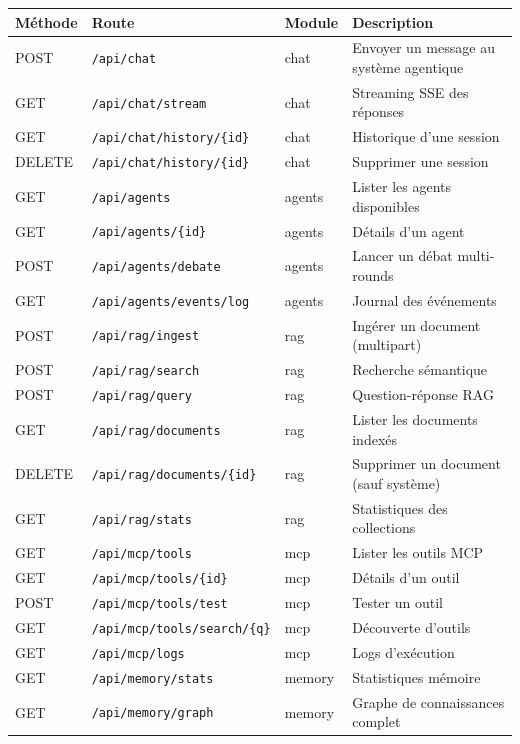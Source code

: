 \documentclass[12pt, a4paper]{article}
\begin{document}
\begin{table}[H]
\centering
\small
\begin{tabularx}{\textwidth}{l l l X}
\toprule
\textbf{Méthode} & \textbf{Route} & \textbf{Module} & \textbf{Description} \\
\midrule
POST & \texttt{/api/chat} & chat & Envoyer un message au système agentique \\
GET & \texttt{/api/chat/stream} & chat & Streaming SSE des réponses \\
GET & \texttt{/api/chat/history/\{id\}} & chat & Historique d'une session \\
DELETE & \texttt{/api/chat/history/\{id\}} & chat & Supprimer une session \\
\midrule
GET & \texttt{/api/agents} & agents & Lister les agents disponibles \\
GET & \texttt{/api/agents/\{id\}} & agents & Détails d'un agent \\
POST & \texttt{/api/agents/debate} & agents & Lancer un débat multi-rounds \\
GET & \texttt{/api/agents/events/log} & agents & Journal des événements \\
\midrule
POST & \texttt{/api/rag/ingest} & rag & Ingérer un document (multipart) \\
POST & \texttt{/api/rag/search} & rag & Recherche sémantique \\
POST & \texttt{/api/rag/query} & rag & Question-réponse RAG \\
GET & \texttt{/api/rag/documents} & rag & Lister les documents indexés \\
DELETE & \texttt{/api/rag/documents/\{id\}} & rag & Supprimer un document (sauf système) \\
GET & \texttt{/api/rag/stats} & rag & Statistiques des collections \\
\midrule
GET & \texttt{/api/mcp/tools} & mcp & Lister les outils MCP \\
GET & \texttt{/api/mcp/tools/\{id\}} & mcp & Détails d'un outil \\
POST & \texttt{/api/mcp/tools/test} & mcp & Tester un outil \\
GET & \texttt{/api/mcp/tools/search/\{q\}} & mcp & Découverte d'outils \\
GET & \texttt{/api/mcp/logs} & mcp & Logs d'exécution \\
\midrule
GET & \texttt{/api/memory/stats} & memory & Statistiques mémoire \\
GET & \texttt{/api/memory/graph} & memory & Graphe de connaissances complet \\

\end{tabularx}
\end{table}
\end{document}
